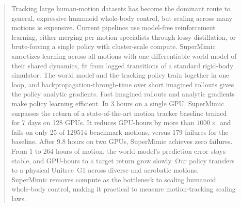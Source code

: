 \documentclass{article}
\begin{document}
\begin{abstract}
Tracking large human-motion datasets has become the dominant route to general, expressive humanoid whole-body control, but scaling across many motions is expensive. Current pipelines use model-free reinforcement learning, either merging per-motion specialists through lossy distillation, or brute-forcing a single policy with cluster-scale compute.
SuperMimic amortizes learning across all motions with one differentiable world model of their shared dynamics, fit from logged transitions of a standard rigid-body simulator. The world model and the tracking policy train together in one loop, and backpropagation-through-time over short imagined rollouts gives the policy analytic gradients. Fast imagined rollouts and analytic gradients make policy learning efficient.
In 3 hours on a single GPU, SuperMimic surpasses the return of a state-of-the-art motion tracker baseline trained for 7 days on 128 GPUs. It reduces GPU-hours by more than $1000\times$ and fails on only 25 of \num{129514} benchmark motions, versus 179 failures for the baseline.  After 9.8 hours on two GPUs, SuperMimic achieves zero failures.
From 1 to 264 hours of motion, the world model's prediction error stays stable, and GPU-hours to a target return grow slowly. Our policy transfers to a physical Unitree~G1 across diverse and acrobatic motions.
SuperMimic removes compute as the bottleneck to scaling humanoid whole-body control, making it practical to measure motion-tracking scaling laws.
\end{abstract}








\clearpage
{}



\clearpage
\appendix
\renewcommand{\thefigure}{A.\arabic{figure}}
\renewcommand{\thetable}{A.\arabic{table}}
\renewcommand{\theequation}{A.\arabic{equation}}
\renewcommand{\thealgorithm}{A.\arabic{algorithm}}
\renewcommand{\theHfigure}{A.\arabic{figure}}
\renewcommand{\theHtable}{A.\arabic{table}}
\renewcommand{\theHequation}{A.\arabic{equation}}
\setcounter{figure}{0}
\setcounter{table}{0}
\setcounter{equation}{0}
\setcounter{algorithm}{0}

\end{document}
